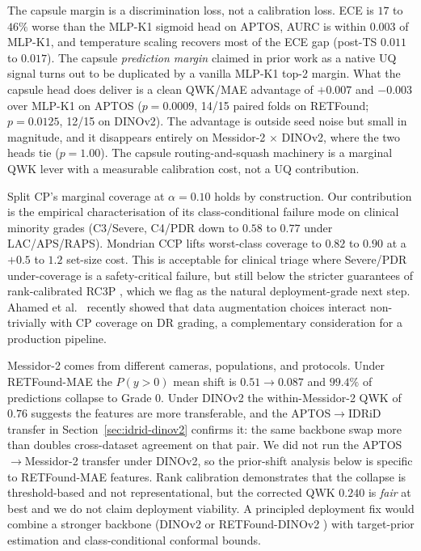 \documentclass[journal]{IEEEtran}
\begin{document}
The capsule margin is a discrimination loss, not a calibration loss. ECE is $17$ to $46\%$ worse than the MLP-K1 sigmoid head on APTOS, AURC is within $0.003$ of MLP-K1, and temperature scaling recovers most of the ECE gap (post-TS $0.011$ to $0.017$). The capsule \emph{prediction margin} claimed in prior work as a native UQ signal turns out to be duplicated by a vanilla MLP-K1 top-2 margin. What the capsule head does deliver is a clean QWK/MAE advantage of $+0.007$ and $-0.003$ over MLP-K1 on APTOS ($p=0.0009$, 14/15 paired folds on RETFound; $p=0.0125$, 12/15 on DINOv2). The advantage is outside seed noise but small in magnitude, and it disappears entirely on Messidor-2 $\times$ DINOv2, where the two heads tie ($p = 1.00$). The capsule routing-and-squash machinery is a marginal QWK lever with a measurable calibration cost, not a UQ contribution.

Split CP's marginal coverage at $\alpha = 0.10$ holds by construction. Our contribution is the empirical characterisation of its class-conditional failure mode on clinical minority grades (C3/Severe, C4/PDR down to $0.58$ to $0.77$ under LAC/APS/RAPS). Mondrian CCP \cite{ref:mondrian} lifts worst-class coverage to $0.82$ to $0.90$ at a $+0.5$ to $1.2$ set-size cost. This is acceptable for clinical triage where Severe/PDR under-coverage is a safety-critical failure, but still below the stricter guarantees of rank-calibrated RC3P \cite{ref:rank_conformal}, which we flag as the natural deployment-grade next step. Ahamed et al.\ \cite{ref:dr_conformal} recently showed that data augmentation choices interact non-trivially with CP coverage on DR grading, a complementary consideration for a production pipeline.

Messidor-2 comes from different cameras, populations, and protocols. Under RETFound-MAE the $P(y{>}0)$ mean shift is $0.51 \to 0.087$ and $99.4\%$ of predictions collapse to Grade 0. Under DINOv2 the within-Messidor-2 QWK of $0.76$ suggests the features are more transferable, and the APTOS$\to$IDRiD transfer in Section~\ref{sec:idrid-dinov2} confirms it: the same backbone swap more than doubles cross-dataset agreement on that pair. We did not run the APTOS$\to$Messidor-2 transfer under DINOv2, so the prior-shift analysis below is specific to RETFound-MAE features. Rank calibration demonstrates that the collapse is threshold-based and not representational, but the corrected QWK $0.240$ is \emph{fair} at best and we do not claim deployment viability. A principled deployment fix would combine a stronger backbone (DINOv2 or RETFound-DINOv2 \cite{ref:zoellin}) with target-prior estimation \cite{ref:bbse,ref:mlls} and class-conditional conformal bounds.
\end{document}
